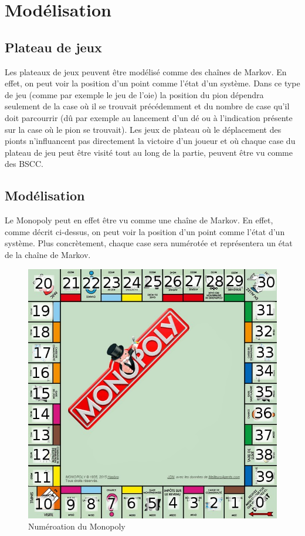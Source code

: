 \documentclass[letterpaper]{article}
\begin{document}
  
\section{Modélisation}

  \subsection{Plateau de jeux}
    Les plateaux de jeux peuvent être modélisé comme des chaînes de Markov.  En effet, on peut 
    voir la position d'un point comme l'état d'un système.  Dans ce type de jeu (comme 
    par exemple le jeu de l'oie) la position du pion dépendra seulement de la case où il 
    se trouvait précédemment et du nombre de case qu'il doit parcourrir (dû par exemple 
    au lancement d'un dé ou à l'indication présente sur la case où le pion se trouvait).
    Les jeux de plateau où le déplacement des pionts n'influancent pas directement la 
    victoire d'un joueur et où chaque case du plateau de jeu peut être visité tout 
    au long de la partie, peuvent être vu comme des BSCC.  
  
  \subsection{Modélisation}
    Le Monopoly peut en effet être vu comme une chaîne de Markov.  En effet, comme décrit
    ci-dessus, on peut voir la position d'un point comme l'état d'un système.  Plus 
    concrètement, chaque case sera numérotée et représentera un état de la chaîne de Markov.
    \begin{figure}[h]
      \centering
      \includegraphics[scale=0.4]{./Images/Monopoly.png}
	\caption{Numéroation du Monopoly \citep{IMG_Monopoly}}
    \end{figure}
    
\end{document}
